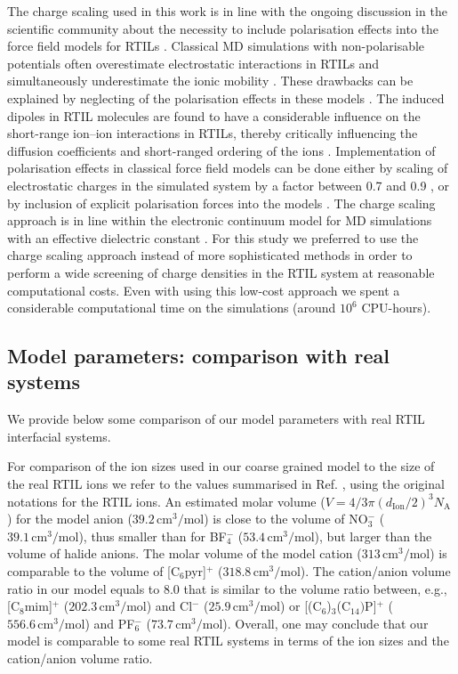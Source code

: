 \documentclass[final,5p,times,twocolumn]{elsarticle}
\begin{document}
The charge scaling used in this work is in line with the ongoing discussion in the scientific community about the necessity to include polarisation effects into the force field models for RTILs \cite{Tazi2010,Dommert2012,Merlet2013}. Classical MD simulations with non-polarisable potentials often overestimate electrostatic interactions in RTILs and simultaneously underestimate the ionic mobility \cite{Dommert2012,Schroder2012}. These drawbacks can be explained by neglecting of the polarisation effects in these models \cite{Dommert2012,Schroder2012}. The induced dipoles in RTIL molecules are found to have a considerable influence on the short-range ion--ion interactions in RTILs, thereby critically influencing the diffusion coefficients and short-ranged ordering of the ions \cite{Schroder2012}. Implementation of polarisation effects in classical force field models can be done either by scaling of electrostatic charges in the simulated system by a factor between 0.7 and 0.9 \cite{Fedorov2008,Fedorov2008a,Dommert2012}, or by inclusion of explicit polarisation forces into the models \cite{Schroder2012,Tazi2010,Merlet2013}. The charge scaling approach is in line within the electronic continuum model for MD simulations with an effective dielectric constant \cite{Leontyev2009}. For this study we preferred to use the charge scaling approach instead of more sophisticated methods \cite{Vatamanu2010,Vatamanu2011,Tazi2010,Merlet2013} in order to perform a wide screening of charge densities in the RTIL system at reasonable computational costs. Even with using this low-cost approach we spent a considerable computational time on the simulations (around $10^6$ CPU-hours).

\subsection{Model parameters: comparison with real systems}

We provide below some comparison of our model parameters with real RTIL interfacial systems.

For comparison of the ion sizes used in our coarse grained model to the size of the real RTIL ions we refer to the values summarised in Ref. \cite{Costa2012}, using the original notations for the RTIL ions. An estimated molar volume ($V = {4/3}\pi (d_{\mathrm{Ion}}/2)^3 N_{\mathrm{A}}$) for the model anion ($39.2\,\mathrm{cm^3/mol}$) is close to the volume of NO$_3^-$ ($39.1\,\mathrm{cm^3/mol}$), thus smaller than for BF$_4^-$ ($53.4\,\mathrm{cm^3/mol}$), but larger than the volume of halide anions. The molar volume of the model cation ($313\,\mathrm{cm^3/mol}$) is comparable to the volume of [C$_6$pyr]$^+$ ($318.8\,\mathrm{cm^3/mol}$). The cation/anion volume ratio in our model equals to $8.0$  that is similar to the volume ratio between, e.g., [C$_8$mim]$^+$ ($202.3\,\mathrm{cm^3/mol}$) and Cl$^-$ ($25.9\,\mathrm{cm^3/mol}$) or [(C$_6$)$_3$(C$_{14})$P]$^+$ ($556.6\,\mathrm{cm^3/mol}$) and PF$_6^-$ ($73.7\,\mathrm{cm^3/mol}$). Overall, one may conclude that our model is comparable to some real RTIL systems in terms of the ion sizes and the cation/anion volume ratio. 
\end{document}
